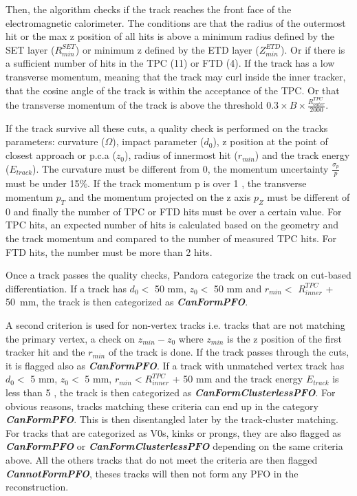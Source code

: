 Then, the algorithm checks if the track reaches the front face of the electromagnetic calorimeter. The conditions are that the radius of the outermost hit or the max z position of all hits is above a minimum radius defined by the SET layer ($R^{SET}_{min}$) or minimum z defined by the ETD layer ($Z^{ETD}_{min}$). Or if there is a sufficient number of hits in the TPC (11) or FTD (4). If the track has a low transverse momentum, meaning that the track may curl inside the inner tracker, that the cosine angle of the track is within the acceptance of the TPC. Or that the transverse momentum of the track is above the threshold $0.3 \times B \times \frac{R^{TPC}_{outer}}{2000}$.

If the track survive all these cuts, a quality check is performed on the tracks parameters: curvature ($\Omega$), impact parameter ($d_0$), z position at the point of closest approach or p.c.a ($z_0$), radius of innermost hit ($r_{min}$) and the track energy ($E_{track}$). The curvature must be different from 0, the momentum uncertainty $\frac{\sigma_p}{p}$ must be under 15\%. If the track momentum p is over 1 \GeV, the transverse momentum $p_T$ and the momentum projected on the z axis $p_Z$ must be different of 0 \GeV and finally the number of TPC or FTD hits must be over a certain value. For TPC hits, an expected number of hits is calculated based on the geometry and the track momentum and compared to the number of measured TPC hits. For FTD hits, the number must be more than 2 hits.

Once a track passes the quality checks, Pandora categorize the track on cut-based differentiation. If a track has  $d_0 <$ 50 mm, $z_0 <$ 50 mm and $r_{min} <$ $R^{TPC}_{inner}$ + \SI{50}{\milli\meter}, the track is then categorized as \textit{\textbf{CanFormPFO}}.

A second criterion is used for non-vertex tracks i.e. tracks that are not matching the primary vertex, a check on $z_{min} - z_0$ where $z_{min}$ is the z position of the first tracker hit and the $r_{min}$ of the track is done. If the track passes through the cuts, it is flagged also as \textit{\textbf{CanFormPFO}}. If a track with unmatched vertex track has $d_0 <$ 5 mm, $z_0 <$ 5 mm, $r_{min} < R^{TPC}_{inner}$ + 50 mm and the track energy $E_{track}$ is less than 5 \GeV, the track is then categorized as \textit{\textbf{CanFormClusterlessPFO}}. For obvious reasons, tracks matching these criteria can end up in the category \textit{\textbf{CanFormPFO}}. This is then disentangled later by the track-cluster matching. For tracks that are categorized as V0s, kinks or prongs, they are also flagged as \textit{\textbf{CanFormPFO}} or \textit{\textbf{CanFormClusterlessPFO}} depending on the same criteria above. All the others tracks that do not meet the criteria are then flagged \textit{\textbf{CannotFormPFO}}, theses tracks will then not form any PFO in the reconstruction.

